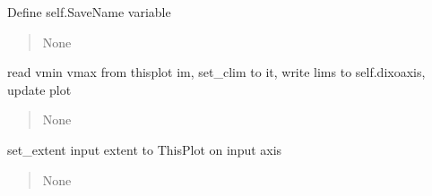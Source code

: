 \documentclass[letterpaper,10pt,english]{sphinxmanual}
\begin{document}
\begin{fulllineitems}

\begin{fulllineitems}
\label{\detokenize{api/killMS.Plot:killMS.Plot.Graph.ClassMplWidget.setSaveName}}
\pysigstartsignatures
{}
\pysigstopsignatures
\sphinxAtStartPar
Define self.SaveName variable
\begin{quote}\begin{description}
\sphinxAtStartPar
None

\end{description}\end{quote}

\end{fulllineitems}


\begin{fulllineitems}
\label{\detokenize{api/killMS.Plot:killMS.Plot.Graph.ClassMplWidget.set_clim}}
\pysigstartsignatures
{}
\pysigstopsignatures
\sphinxAtStartPar
read vmin vmax from thisplot im, set\_clim to it, write lims to self.dixoaxis, update plot
\begin{quote}\begin{description}
\sphinxAtStartPar
None

\end{description}\end{quote}

\end{fulllineitems}


\begin{fulllineitems}
\label{\detokenize{api/killMS.Plot:killMS.Plot.Graph.ClassMplWidget.set_extent}}
\pysigstartsignatures
{}
\pysigstopsignatures
\sphinxAtStartPar
set\_extent input extent to ThisPlot on input axis
\begin{quote}\begin{description}
\sphinxAtStartPar
None


\end{description}
\end{quote}
\end{fulllineitems}
\end{fulllineitems}
\end{document}

